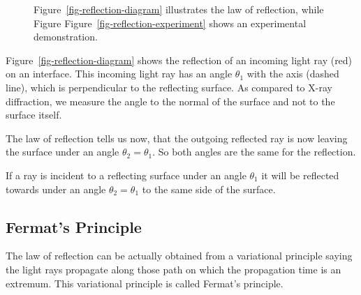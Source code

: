 \documentclass[
  a4paper,
]{book}
\begin{document}
\begin{figure}
\begin{minipage}{0.50\linewidth}
{}


\end{minipage}%

\caption{\label{fig-reflection}Figure~\ref{fig-reflection-diagram}
illustrates the law of reflection, while Figure
Figure~\ref{fig-reflection-experiment} shows an experimental
demonstration.}

\end{figure}%

Figure~\ref{fig-reflection-diagram} shows the reflection of an incoming
light ray (red) on an interface. This incoming light ray has an angle
\(\theta_{1}\) with the axis (dashed line), which is perpendicular to
the reflecting surface. As compared to X-ray diffraction, we measure the
angle to the normal of the surface and not to the surface itself.

The law of reflection tells us now, that the outgoing reflected ray is
now leaving the surface under an angle \(\theta_2=\theta_1\). So both
angles are the same for the reflection.

\begin{tcolorbox}[enhanced jigsaw, coltitle=black, title=\textcolor{quarto-callout-tip-color}{\faLightbulb}\hspace{0.5em}{Law of Reflection}, colframe=quarto-callout-tip-color-frame, toprule=.15mm, opacitybacktitle=0.6, left=2mm, opacityback=0, breakable, toptitle=1mm, bottomtitle=1mm, leftrule=.75mm, arc=.35mm, titlerule=0mm, colbacktitle=quarto-callout-tip-color!10!white, rightrule=.15mm, bottomrule=.15mm, colback=white]

If a ray is incident to a reflecting surface under an angle \(\theta_1\)
it will be reflected towards under an angle \(\theta_2=\theta_1\) to the
same side of the surface.

\end{tcolorbox}

\subsection{Fermat's Principle}\label{sec-fermat-principle}

The law of reflection can be actually obtained from a variational
principle saying the light rays propagate along those path on which the
propagation time is an extremum. This variational principle is called
Fermat's principle.
\end{document}
